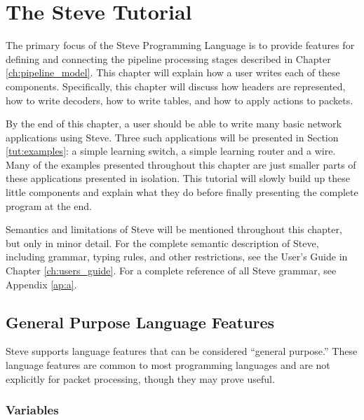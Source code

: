 \chapter{The Steve Tutorial} \label{ch:tutorial}

%

The primary focus of the Steve Programming Language is to provide features for
defining and connecting the pipeline processing stages described in Chapter
\ref{ch:pipeline_model}. This chapter will explain how a user writes each of these
components. Specifically, this chapter will discuss how headers are represented, how to
write decoders, how to write tables, and how to apply actions to packets.

By the end of this chapter, a user should be able to write many basic network
applications using Steve. Three such applications will be presented in Section \ref{tut:examples}: a simple
learning switch, a simple learning router and a wire. Many of the examples
presented throughout this chapter are just smaller parts of these applications
presented in isolation. This tutorial will slowly build
up these little components and explain what they do before finally presenting
the complete program at the end.

Semantics and limitations of Steve will be mentioned throughout this chapter, 
but only in minor detail. For the complete semantic description of
Steve, including grammar, typing rules, and other restrictions, see the User's
Guide in Chapter \ref{ch:users_guide}. For a complete reference of all Steve
grammar, see Appendix \ref{ap:a}.

\section{General Purpose Language Features} \label{tut:gen_purp}

Steve supports language features that can be considered
``general purpose.'' These language features are common to most programming
languages and are not explicitly for packet processing, though they may prove
useful.

\subsection{Variables} \label{tut:variable}

